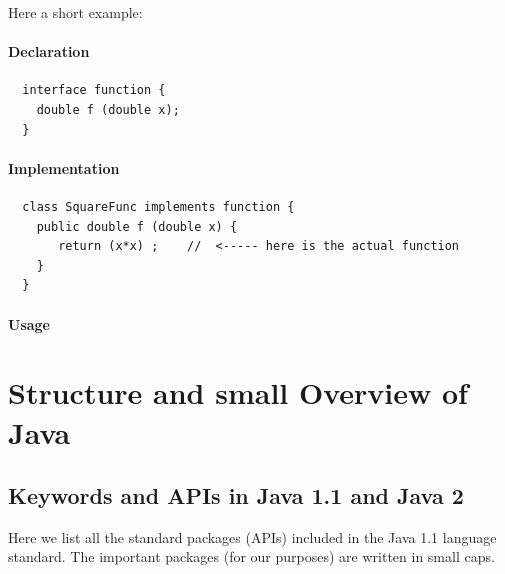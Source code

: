 Here a short example:
\paragraph{Declaration} 
\begin{verbatim}
  interface function {
    double f (double x); 
  }
\end{verbatim}

\paragraph{Implementation}
\begin{verbatim}
  class SquareFunc implements function {
    public double f (double x) {
       return (x*x) ;    //  <----- here is the actual function
    }
  }
\end{verbatim}

\paragraph{Usage}



\section{Structure and small Overview of Java}

\subsection{Keywords and APIs in Java 1.1 and Java 2}

Here we list all the standard packages (APIs) included in the Java 1.1
language standard. The important packages (for our purposes) are
written in small caps.

